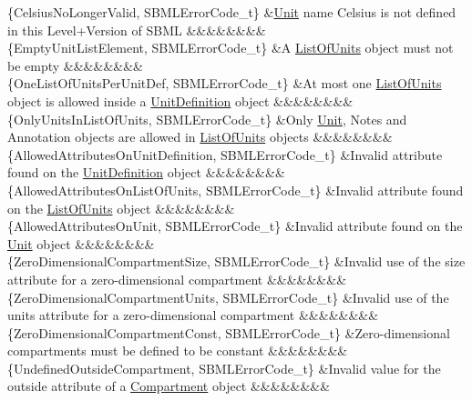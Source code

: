 \begin{DoxyParagraph}{}
\begin{longtabu}
\{Celsius\+No\+Longer\+Valid, S\+B\+M\+L\+Error\+Code\+\_\+t\} &\hyperlink{class_unit}{Unit} name \textquotesingle{}Celsius\textquotesingle{} is not defined in this Level+\+Version of S\+B\+ML &&&&&&&&\\
\{Empty\+Unit\+List\+Element, S\+B\+M\+L\+Error\+Code\+\_\+t\} &A \hyperlink{class_list_of_units}{List\+Of\+Units} object must not be empty &&&&&&&&\\
\{One\+List\+Of\+Units\+Per\+Unit\+Def, S\+B\+M\+L\+Error\+Code\+\_\+t\} &At most one \hyperlink{class_list_of_units}{List\+Of\+Units} object is allowed inside a \hyperlink{class_unit_definition}{Unit\+Definition} object &&&&&&&&\\
\{Only\+Units\+In\+List\+Of\+Units, S\+B\+M\+L\+Error\+Code\+\_\+t\} &Only \hyperlink{class_unit}{Unit}, Notes and Annotation objects are allowed in \hyperlink{class_list_of_units}{List\+Of\+Units} objects &&&&&&&&\\
\{Allowed\+Attributes\+On\+Unit\+Definition, S\+B\+M\+L\+Error\+Code\+\_\+t\} &Invalid attribute found on the \hyperlink{class_unit_definition}{Unit\+Definition} object &&&&&&&&\\
\{Allowed\+Attributes\+On\+List\+Of\+Units, S\+B\+M\+L\+Error\+Code\+\_\+t\} &Invalid attribute found on the \hyperlink{class_list_of_units}{List\+Of\+Units} object &&&&&&&&\\
\{Allowed\+Attributes\+On\+Unit, S\+B\+M\+L\+Error\+Code\+\_\+t\} &Invalid attribute found on the \hyperlink{class_unit}{Unit} object &&&&&&&&\\
\{Zero\+Dimensional\+Compartment\+Size, S\+B\+M\+L\+Error\+Code\+\_\+t\} &Invalid use of the \textquotesingle{}size\textquotesingle{} attribute for a zero-\/dimensional compartment &&&&&&&&\\
\{Zero\+Dimensional\+Compartment\+Units, S\+B\+M\+L\+Error\+Code\+\_\+t\} &Invalid use of the \textquotesingle{}units\textquotesingle{} attribute for a zero-\/dimensional compartment &&&&&&&&\\
\{Zero\+Dimensional\+Compartment\+Const, S\+B\+M\+L\+Error\+Code\+\_\+t\} &Zero-\/dimensional compartments must be defined to be constant &&&&&&&&\\
\{Undefined\+Outside\+Compartment, S\+B\+M\+L\+Error\+Code\+\_\+t\} &Invalid value for the \textquotesingle{}outside\textquotesingle{} attribute of a \hyperlink{class_compartment}{Compartment} object &&&&&&&&\\

\end{longtabu}
\end{DoxyParagraph}
